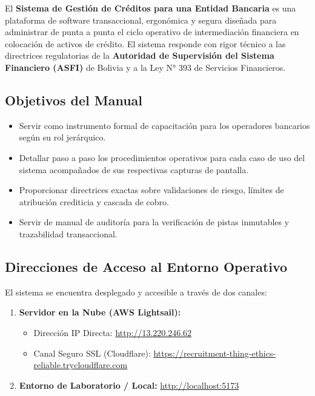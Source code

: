 \documentclass[11pt,letterpaper]{article}
\begin{document}
El \textbf{Sistema de Gestión de Créditos para una Entidad Bancaria} es una plataforma de software transaccional, ergonómica y segura diseñada para administrar de punta a punta el ciclo operativo de intermediación financiera en colocación de activos de crédito. El sistema responde con rigor técnico a las directrices regulatorias de la \textbf{Autoridad de Supervisión del Sistema Financiero (ASFI)} de Bolivia y a la Ley N° 393 de Servicios Financieros.

\subsection{Objetivos del Manual}
\begin{itemize}[leftmargin=*]
    \item Servir como instrumento formal de capacitación para los operadores bancarios según su rol jerárquico.
    \item Detallar paso a paso los procedimientos operativos para cada caso de uso del sistema acompañados de sus respectivas capturas de pantalla.
    \item Proporcionar directrices exactas sobre validaciones de riesgo, límites de atribución crediticia y cascada de cobro.
    \item Servir de manual de auditoría para la verificación de pistas inmutables y trazabilidad transaccional.
\end{itemize}

\subsection{Direcciones de Acceso al Entorno Operativo}
El sistema se encuentra desplegado y accesible a través de dos canales:
\begin{enumerate}
    \item \textbf{Servidor en la Nube (AWS Lightsail):} 
    \begin{itemize}
        \item Dirección IP Directa: \url{http://13.220.246.62}
        \item Canal Seguro SSL (Cloudflare): \url{https://recruitment-thing-ethics-reliable.trycloudflare.com}
    \end{itemize}
    \item \textbf{Entorno de Laboratorio / Local:} \url{http://localhost:5173}
\end{enumerate}

\end{document}
